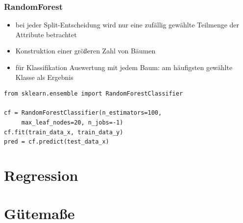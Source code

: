 \begin{frame}[fragile]
  \frametitle{RandomForest}

    \begin{itemize}
      \item bei jeder Split-Entscheidung wird nur eine zufällig gewählte Teilmenge der Attribute betrachtet
      \item Konstruktion einer größeren Zahl von Bäumen
      \item für Klassifikation Auswertung mit jedem Baum: am häufigsten gewählte Klasse als Ergebnis
  \end{itemize}

  \begin{verbatim}
from sklearn.ensemble import RandomForestClassifier 

cf = RandomForestClassifier(n_estimators=100, 
     max_leaf_nodes=20, n_jobs=-1)
cf.fit(train_data_x, train_data_y)
pred = cf.predict(test_data_x)
\end{verbatim}
\end{frame}

\section{Regression}



\section{Gütemaße}





